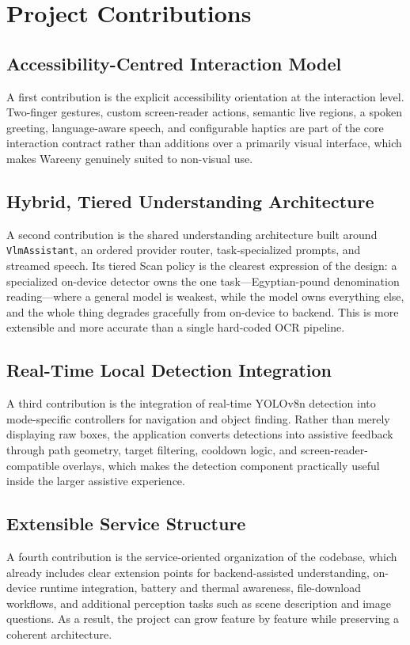 \documentclass[12pt,a4paper]{report}
\begin{document}
\section{Project Contributions}
\subsection{Accessibility-Centred Interaction Model}
A first contribution is the explicit accessibility orientation at the interaction level. Two-finger gestures, custom screen-reader actions, semantic live regions, a spoken greeting, language-aware speech, and configurable haptics are part of the core interaction contract rather than additions over a primarily visual interface, which makes Wareeny genuinely suited to non-visual use.

\subsection{Hybrid, Tiered Understanding Architecture}
A second contribution is the shared understanding architecture built around \texttt{VlmAssistant}, an ordered provider router, task-specialized prompts, and streamed speech. Its tiered Scan policy is the clearest expression of the design: a specialized on-device detector owns the one task---Egyptian-pound denomination reading---where a general model is weakest, while the model owns everything else, and the whole thing degrades gracefully from on-device to backend. This is more extensible and more accurate than a single hard-coded OCR pipeline.

\subsection{Real-Time Local Detection Integration}
A third contribution is the integration of real-time YOLOv8n detection into mode-specific controllers for navigation and object finding. Rather than merely displaying raw boxes, the application converts detections into assistive feedback through path geometry, target filtering, cooldown logic, and screen-reader-compatible overlays, which makes the detection component practically useful inside the larger assistive experience.

\subsection{Extensible Service Structure}
A fourth contribution is the service-oriented organization of the codebase, which already includes clear extension points for backend-assisted understanding, on-device runtime integration, battery and thermal awareness, file-download workflows, and additional perception tasks such as scene description and image questions. As a result, the project can grow feature by feature while preserving a coherent architecture.
\end{document}
